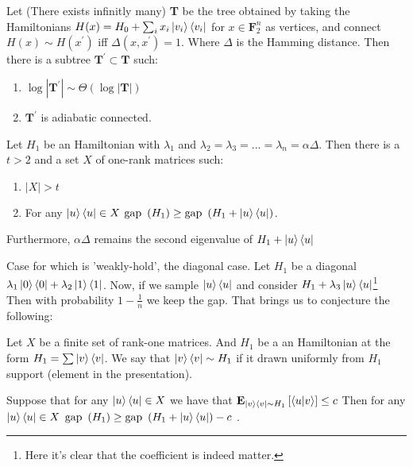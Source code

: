 \documentclass[manuscript,screen,review]{acmart}
\begin{document}
\begin{claim}
Let (There exists infinitly many) \textbf{T} be the tree obtained by taking the Hamiltonians $H(x) = H_{0} + \sum_{i}x_i\ket{v_i}\bra{v_i}$ for $x\in \mathbf{F}_2^n$ as vertices, and connect $H(x)\sim H(x^\prime)$ iff $\Delta(x,x^\prime)= 1$. Where $\Delta$ is the Hamming distance. Then there is a subtree $\textbf{T}^\prime \subset \textbf{T}$ such:  
\begin{enumerate}
    \item $\log|\textbf{T}^\prime| \sim \Theta(\log |\textbf{T}| ) $
    \item $\textbf{T}^\prime$ is adiabatic connected. 
\end{enumerate}
\end{claim}


\begin{claim}
\label{claim:claim1}
    Let $H_{1}$ be an Hamiltonian with $\lambda_{1}$ and $\lambda_2=\lambda_{3}=...=\lambda_{n}=\alpha\Delta$. Then there is a $t > 2$ and a set $X$ of one-rank matrices such: 
    \begin{enumerate}
    \item $|X| > t$
        \item For any $\ket{u}\bra{u} \in X$  $\text{gap } \left( H_{1} \right) \ge \text{gap } \left( H_{1} + \ket{u}\bra{u}  \right) $.  
    \end{enumerate}
    Furthermore, $\alpha \Delta$ remains the second eigenvalue of $H_{1} + \ket{u}\bra{u}$
\end{claim}

\newcommand{\kbra}[2]{\ket{#1}\bra{#2}}
\newcommand{\kbri}{\kbra{i^\prime}{i}}

Case for which  is 'weakly-hold', the diagonal case. Let $H_{1}$ be a diagonal $\lambda_{1}\ket{0}\bra{0} + \lambda_{2}\ket{1}\bra{1}$. Now, if we sample $\ket{u}\bra{u}$ and consider $H_{1} + \lambda_{3}\ket{u}\bra{u}$\footnote{Here it's clear that the coefficient is indeed matter.} Then with probability $1 - \frac{1}{n}$ we keep the gap. That brings us to conjecture the following:

\begin{claim}
Let $X$ be a finite set of rank-one matrices. And $H_{1}$ be a
an Hamiltonian at the form $H_1 = \sum{ \ket{v}\bra{v}}$. We say that $\ket{v}\bra{v} \sim H_{1}$ if it drawn uniformly from $H_{1}$ support (element in the presentation).

Suppose that for any $\ket{u}\bra{u} \in X $ we have that $\textbf{E}_{\ket{v}\bra{v}\sim H_1}\left[  \braket{u|v}  \right] \le c$ Then for any $\ket{u}\bra{u} \in X$  $\text{gap } \left( H_{1} \right) \ge \text{gap } \left( H_{1} + \ket{u}\bra{u}  \right) - c$ .  
\end{claim}
\end{document}

